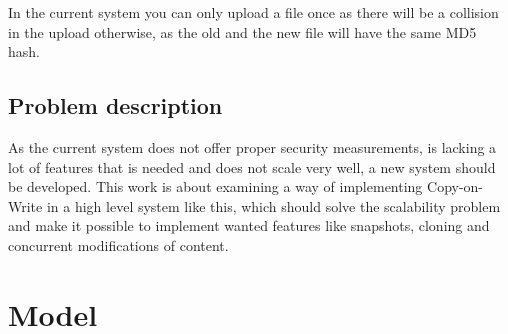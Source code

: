 \documentclass[a4paper,12pt]{article}
\begin{document}
In the current system you can only upload a file once as there will be a collision in the upload otherwise, as the old and 
the new file will have the same MD5 hash.  

\subsection{Problem description}
As the current system does not offer proper security measurements, is lacking a lot of features that is needed and does not 
scale very well, a new system should be developed. This work is about examining a way of implementing Copy-on-Write in a 
high level system like this, which should solve the scalability problem and make it possible to implement wanted features
like snapshots, cloning and concurrent modifications of content.

%



\newpage 
\section{Model}
\end{document}
